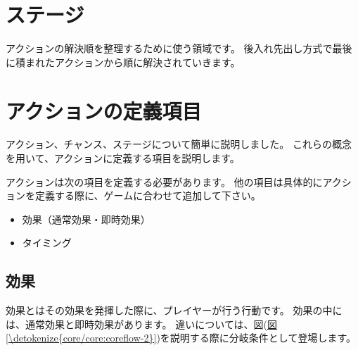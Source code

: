 \documentclass[letterpaper,10pt,dvipdfmx]{sphinxmanual}
\begin{document}
\section{ステージ}
\label{\detokenize{core/core:id5}}
アクションの解決順を整理するために使う領域です。
後入れ先出し方式で最後に積まれたアクションから順に解決されていきます。


\section{アクションの定義項目}
\label{\detokenize{core/core:id6}}
アクション、チャンス、ステージについて簡単に説明しました。
これらの概念を用いて、アクションに定義する項目を説明します。

アクションは次の項目を定義する必要があります。
他の項目は具体的にアクションを定義する際に、ゲームに合わせて追加して下さい。
\begin{itemize}
\item {} 
効果（通常効果・即時効果）

\item {} 
タイミング

\end{itemize}


\subsection{効果}
\label{\detokenize{core/core:id7}}
効果とはその効果を発揮した際に、プレイヤーが行う行動です。
効果の中には、通常効果と即時効果があります。
違いについては、図(\hyperref[\detokenize{core/core:coreflow-2}]{図 \ref{\detokenize{core/core:coreflow-2}}})を説明する際に分岐条件として登場します。
\end{document}
